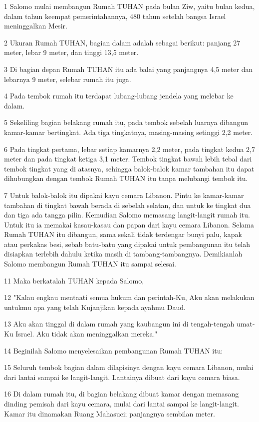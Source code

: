 \par 1 Salomo mulai membangun Rumah TUHAN pada bulan Ziw, yaitu bulan kedua, dalam tahun keempat pemerintahannya, 480 tahun setelah bangsa Israel meninggalkan Mesir.
\par 2 Ukuran Rumah TUHAN, bagian dalam adalah sebagai berikut: panjang 27 meter, lebar 9 meter, dan tinggi 13,5 meter.
\par 3 Di bagian depan Rumah TUHAN itu ada balai yang panjangnya 4,5 meter dan lebarnya 9 meter, selebar rumah itu juga.
\par 4 Pada tembok rumah itu terdapat lubang-lubang jendela yang melebar ke dalam.
\par 5 Sekeliling bagian belakang rumah itu, pada tembok sebelah luarnya dibangun kamar-kamar bertingkat. Ada tiga tingkatnya, masing-masing setinggi 2,2 meter.
\par 6 Pada tingkat pertama, lebar setiap kamarnya 2,2 meter, pada tingkat kedua 2,7 meter dan pada tingkat ketiga 3,1 meter. Tembok tingkat bawah lebih tebal dari tembok tingkat yang di atasnya, sehingga balok-balok kamar tambahan itu dapat dihubungkan dengan tembok Rumah TUHAN itu tanpa melubangi tembok itu.
\par 7 Untuk balok-balok itu dipakai kayu cemara Libanon. Pintu ke kamar-kamar tambahan di tingkat bawah berada di sebelah selatan, dan untuk ke tingkat dua dan tiga ada tangga pilin. Kemudian Salomo memasang langit-langit rumah itu. Untuk itu ia memakai kasau-kasau dan papan dari kayu cemara Libanon. Selama Rumah TUHAN itu dibangun, sama sekali tidak terdengar bunyi palu, kapak atau perkakas besi, sebab batu-batu yang dipakai untuk pembangunan itu telah disiapkan terlebih dahulu ketika masih di tambang-tambangnya. Demikianlah Salomo membangun Rumah TUHAN itu sampai selesai.
\par 11 Maka berkatalah TUHAN kepada Salomo,
\par 12 "Kalau engkau mentaati semua hukum dan perintah-Ku, Aku akan melakukan untukmu apa yang telah Kujanjikan kepada ayahmu Daud.
\par 13 Aku akan tinggal di dalam rumah yang kaubangun ini di tengah-tengah umat-Ku Israel. Aku tidak akan meninggalkan mereka."
\par 14 Beginilah Salomo menyelesaikan pembangunan Rumah TUHAN itu:
\par 15 Seluruh tembok bagian dalam dilapisinya dengan kayu cemara Libanon, mulai dari lantai sampai ke langit-langit. Lantainya dibuat dari kayu cemara biasa.
\par 16 Di dalam rumah itu, di bagian belakang dibuat kamar dengan memasang dinding pemisah dari kayu cemara, mulai dari lantai sampai ke langit-langit. Kamar itu dinamakan Ruang Mahasuci; panjangnya sembilan meter.
